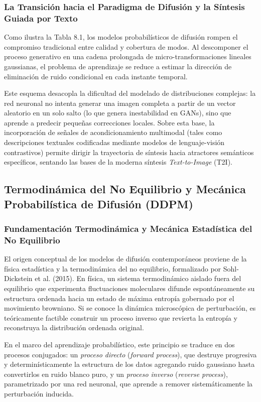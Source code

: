 \subsubsection{La Transición hacia el Paradigma de Difusión y la Síntesis Guiada por Texto}

Como ilustra la Tabla 8.1, los modelos probabilísticos de difusión rompen el compromiso tradicional entre calidad y cobertura de modos. Al descomponer el proceso generativo en una cadena prolongada de micro-transformaciones lineales gaussianas, el problema de aprendizaje se reduce a estimar la dirección de eliminación de ruido condicional en cada instante temporal.

Este esquema desacopla la dificultad del modelado de distribuciones complejas: la red neuronal no intenta generar una imagen completa a partir de un vector aleatorio en un solo salto (lo que genera inestabilidad en GANs), sino que aprende a predecir pequeñas correcciones locales. Sobre esta base, la incorporación de señales de acondicionamiento multimodal (tales como descripciones textuales codificadas mediante modelos de lenguaje-visión contrastivos) permite dirigir la trayectoria de síntesis hacia atractores semánticos específicos, sentando las bases de la moderna síntesis \textit{Text-to-Image} (T2I).

\subsection{Termodinámica del No Equilibrio y Mecánica Probabilística de Difusión (DDPM)}

\subsubsection{Fundamentación Termodinámica y Mecánica Estadística del No Equilibrio}

El origen conceptual de los modelos de difusión contemporáneos proviene de la física estadística y la termodinámica del no equilibrio, formalizado por Sohl-Dickstein et al. (2015). En física, un sistema termodinámico aislado fuera del equilibrio que experimenta fluctuaciones moleculares difunde espontáneamente su estructura ordenada hacia un estado de máxima entropía gobernado por el movimiento browniano. Si se conoce la dinámica microscópica de perturbación, es teóricamente factible construir un proceso inverso que revierta la entropía y reconstruya la distribución ordenada original.

En el marco del aprendizaje probabilístico, este principio se traduce en dos procesos conjugados: un \textit{proceso directo} (\textit{forward process}), que destruye progresiva y determinísticamente la estructura de los datos agregando ruido gaussiano hasta convertirlos en ruido blanco puro, y un \textit{proceso inverso} (\textit{reverse process}), parametrizado por una red neuronal, que aprende a remover sistemáticamente la perturbación inducida.

